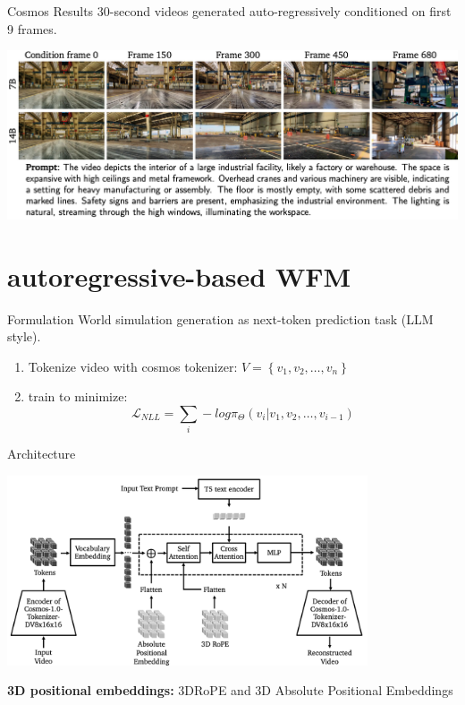 \documentclass{beamer}
\begin{document}
\begin{frame}{Cosmos Results}
    30-second videos generated auto-regressively conditioned on first 9 frames. 
	\begin{center}
            \includegraphics[width=1.0\textwidth]{./img/diff_arch_result.png}
	\end{center}
\end{frame}

\section{autoregressive-based WFM}
\begin{frame}{Formulation}
    World simulation generation as next-token prediction task (LLM style).\newline
    \vspace{-1em}
    \begin{enumerate}[label=\arabic*.]
        \item Tokenize video with cosmos tokenizer: $V = \left\{v_1, v_2, \dots, v_n \right\}$
        \item train to minimize: \[\mathcal{L}_{NLL} = \sum_i -log \pi_\Theta(v_i | v_1, v_2, \dots, v_{i-1})\]
    \end{enumerate}
\end{frame}

\begin{frame}{Architecture}
	\begin{center}
            \includegraphics[width=0.8\textwidth]{./img/auto_arch.png}
	\end{center}
    \textbf{3D positional embeddings:} 3DRoPE and 3D Absolute Positional Embeddings 
    \newline

\end{frame}
\end{document}

